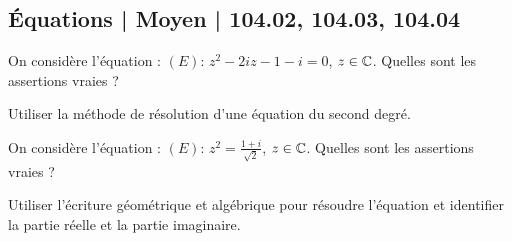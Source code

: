 \subsection{Équations | Moyen | 104.02, 104.03, 104.04}




\begin{question} 
On considère l'équation : $(E) : \, z^2-2iz-1-i=0$, $z\in \mathbb{C}$.   Quelles sont les assertions vraies ?
\begin{answers}
    

    
\end{answers}
\begin{explanations}
Utiliser la méthode de résolution d'une équation du second degré.
\end{explanations}

\end{question}



\begin{question} 
On considère l'équation : $(E) : \, z^2 = \frac{1+i}{\sqrt 2}$, $z\in \mathbb{C}$.   Quelles sont les assertions vraies ?
\begin{answers}
      
    

    
    
\end{answers}
\begin{explanations}
Utiliser l'écriture géométrique et algébrique pour résoudre l'équation et identifier la partie réelle et la partie imaginaire.
\end{explanations}

\end{question}


